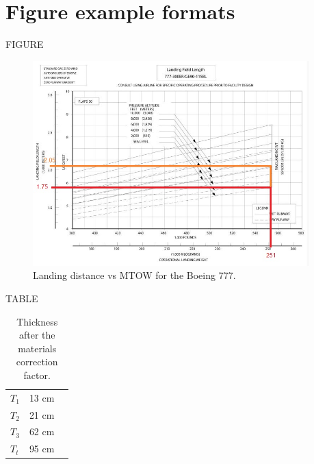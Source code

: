 \chapter{Figure example formats}

FIGURE
\begin{figure}[H]
	\centering
	\includegraphics[clip, trim=0cm 0cm 0cm 0cm, width=0.95\textwidth]{./images/B777/landingdistance777}
	\caption{Landing distance vs MTOW for the Boeing 777.} %
	\label{} %
\end{figure}


TABLE
\begin{table}[htb]
	\centering
	\begin{tabular}{ll p{5cm}}
		\midrule[2pt]
		\(T_1\)& 13 cm\\
		\(T_2\) & 21 cm\\
		\(T_3\)& 62 cm \\
		\(T_t\)& 95 cm\\
		\bottomrule[2pt]
	\end{tabular}
	\caption{Thickness after the materials correction factor.}
	\label{}
\end{table}